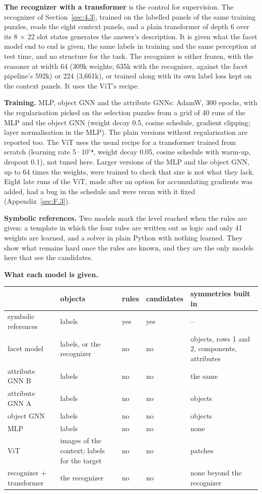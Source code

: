 \textbf{The recognizer with a transformer} is the control for supervision. The recognizer of Section~\ref{sec:4.3}, trained on the labelled panels of the same training puzzles, reads the eight context panels, and a plain transformer of depth 6 over its 8 × 22 slot states generates the answer's description. It is given what the facet model end to end is given, the same labels in training and the same perception at test time, and no structure for the task. The recognizer is either frozen, with the reasoner at width 64 (309k weights; 635k with the recognizer, against the facet pipeline's 592k) or 224 (3,661k), or trained along with its own label loss kept on the context panels. It uses the ViT's recipe.

\textbf{Training.} MLP, object GNN and the attribute GNNs: AdamW, 300 epochs, with the regularisation picked on the selection puzzles from a grid of 40 runs of the MLP and the object GNN (weight decay 0.5, cosine schedule, gradient clipping; layer normalisation in the MLP). The plain versions without regularisation are reported too. The ViT uses the usual recipe for a transformer trained from scratch (learning rate 5·10⁻⁴, weight decay 0.05, cosine schedule with warm-up, dropout 0.1), not tuned here. Larger versions of the MLP and the object GNN, up to 64 times the weights, were trained to check that size is not what they lack. Eight late runs of the ViT, made after an option for accumulating gradients was added, had a bug in the schedule and were rerun with it fixed (Appendix~\ref{sec:F.3}).

\textbf{Symbolic references.} Two models mark the level reached when the rules are given: a template in which the four rules are written out as logic and only 41 weights are learned, and a solver in plain Python with nothing learned. They show what remains hard once the rules are known, and they are the only models here that see the candidates.

\textbf{What each model is given.}

\begin{center}\small
\begin{tabularx}{\linewidth}{@{}YYllY@{}}
\toprule
 & objects & rules & candidates & symmetries built in \\
\midrule
symbolic references & labels & yes & yes & – \\
facet model & labels, or the recognizer & no & no & objects, rows 1 and 2, components, attributes \\
attribute GNN B & labels & no & no & the same \\
attribute GNN A & labels & no & no & objects \\
object GNN & labels & no & no & objects \\
MLP & labels & no & no & none \\
ViT & images of the context; labels for the target & no & no & patches \\
recognizer + transformer & the recognizer & no & no & none beyond the recognizer \\
\bottomrule
\end{tabularx}
\end{center}
